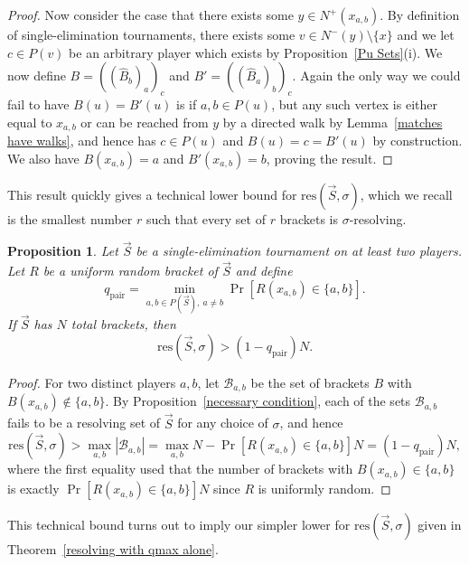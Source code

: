 \documentclass[12pt,letterpaper]{article}
\newtheorem{prop}[thm]{Proposition}
\theoremstyle{definition}
\newcommand{\sig}{\sigma}
\renewcommand{\1}{\mathbbm{1}}
\newcommand{\sm}{\setminus}
\renewcommand{\c}[1]{\mathcal{#1}}
\newcommand{\tour}{\vec{S}}
\newcommand{\res}{\mathrm{res}}
\begin{document}
\begin{proof}
	Now consider the case that there exists some $y\in N^+(x_{a,b})$.  By definition of single-elimination tournaments, there exists some $v\in N^-(y)\sm \{x\}$ and we let $c\in P(v)$ be an arbitrary player which exists by Proposition~\ref{Pu Sets}(i).  We now define $B=((\widehat{B}_b)_a)_c$ and $B'=((\widehat{B}_a)_b)_c$.  Again the only way we could fail to have $B(u)=B'(u)$ is if $a,b\in P(u)$, but any such vertex is either equal to $x_{a,b}$ or can be reached from $y$ by a directed walk by Lemma~\ref{matches have walks}, and hence has $c\in P(u)$ and $B(u)=c=B'(u)$ by construction.  We also have $B(x_{a,b})=a$ and $B'(x_{a,b})=b$, proving the result.
\end{proof}

This result quickly gives a technical lower bound for $\res(\tour,\sig)$, which we recall is the smallest number $r$ such that every set of $r$ brackets is $\sig$-resolving.
\begin{prop}\label{resolving lower bound technical}
	Let $\tour$ be a single-elimination tournament on at least two players.  Let $R$ be a uniform random bracket of $\tour$ and define 
	\[q_{\mathrm{pair}}=\min_{a,b\in P(\tour),\ a\ne b} \Pr[R(x_{a,b})\in \{a,b\}].\]
	If $\tour$ has $N$ total brackets, then
	\[\res(\tour,\sig)>(1-q_{\mathrm{pair}})N.\] 
\end{prop}
\begin{proof}
	For two distinct players $a,b$, let $\c{B}_{a,b}$ be the set of brackets $B$ with $B(x_{a,b})\notin \{a,b\}$.   By Proposition~\ref{necessary condition}, each of the sets $\c{B}_{a,b}$ fails to be a resolving set of $\tour$ for any choice of $\sig$, and hence
	\[\res(\tour,\sig)>\max_{a,b} |\c{B}_{a,b}|=\max_{a,b} N-\Pr[R(x_{a,b})\in \{a,b\}] N=(1-q_{\mathrm{pair}})N,\]
	where the first equality used that the number of brackets with $B(x_{a,b})\in \{a,b\}$ is exactly $\Pr[R(x_{a,b})\in \{a,b\}] N$ since $R$ is uniformly random.
\end{proof}
This technical bound turns out to imply our simpler lower for $\res(\tour,\sig)$ given in Theorem~\ref{resolving with qmax alone}.
\end{document}
